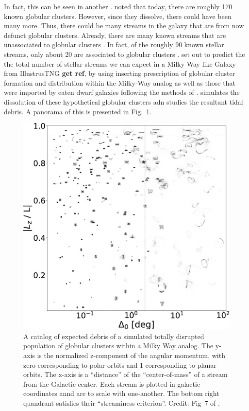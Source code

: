             In fact, this can be seen in another \citet{2024ApJ...976...54P}. \citet{2024ApJ...976...54P} noted that today, there are roughly 170 known globular clusters. However, since they dissolve, there could have been many more. Thus, there could be many streams in the galaxy that are from now defunct globular clusters. Already, there are many known streams that are unassociated to globular clusters \citep{2022ApJ...926..107M}. In fact, of the roughly 90 known stellar streams, only about 20 are associated to globular clusters \citep{2024ApJ...967...89I}. \citet{2024ApJ...976...54P} set out to predict the the total number of stellar streams we can expect in a Milky Way like Galaxy from IllustrusTNG \textbf{get ref}, by using inserting prescription of globular cluster formation and distribution within the Milky-Way analog as well as those that were imported by eaten dwarf galaxies following the methods of \citet{2022MNRAS.514.4736C,2023MNRAS.522.5638C}. \citet{2024ApJ...976...54P} simulates the dissolution of these hypothetical globular clusters adn studies the resultant tidal debris. A panorama of this is presented in Fig.~\ref{fig:perason-2024-fig}. 
            \begin{figure}
                \includegraphics[width=\linewidth]{images/perason-2024-fig.jpg}
                \caption{A catalog of expected debris of a simulated totally disrupted population of globular clusters within a Milky Way analog. The y-axis is the normalized z-component of the angular momentum, with zero corresponding to polar orbits and 1 corresponding to planar orbits. The x-axis is a ``distance'' of the ``center-of-mass'' of a stream from the Galactic center. Each stream is plotted in galactic coordinates annd are to scale with one-another. The bottom right quandrant satisfies their ``streaminess criterion''. Credit: Fig~7 of  \citet{2024ApJ...976...54P}.}
                \label{fig:perason-2024-fig}
            \end{figure}
